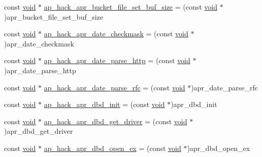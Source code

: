 \begin{DoxyCompactItemize}
\item 
const \hyperlink{group__MOD__ISAPI_gacd6cdbf73df3d9eed42fa493d9b621a6}{void} $\ast$ \hyperlink{srclib_2apr-util_2exports_8c_af76f18ce14697610cd245b2a5c2c5cd8}{ap\+\_\+hack\+\_\+apr\+\_\+bucket\+\_\+file\+\_\+set\+\_\+buf\+\_\+size} = (const \hyperlink{group__MOD__ISAPI_gacd6cdbf73df3d9eed42fa493d9b621a6}{void} $\ast$)apr\+\_\+bucket\+\_\+file\+\_\+set\+\_\+buf\+\_\+size
\item 
const \hyperlink{group__MOD__ISAPI_gacd6cdbf73df3d9eed42fa493d9b621a6}{void} $\ast$ \hyperlink{srclib_2apr-util_2exports_8c_a54a3736a0958f79fdb1567c67cb9e0e3}{ap\+\_\+hack\+\_\+apr\+\_\+date\+\_\+checkmask} = (const \hyperlink{group__MOD__ISAPI_gacd6cdbf73df3d9eed42fa493d9b621a6}{void} $\ast$)apr\+\_\+date\+\_\+checkmask
\item 
const \hyperlink{group__MOD__ISAPI_gacd6cdbf73df3d9eed42fa493d9b621a6}{void} $\ast$ \hyperlink{srclib_2apr-util_2exports_8c_a68bec97dff5362fa01a666ac7c37fba7}{ap\+\_\+hack\+\_\+apr\+\_\+date\+\_\+parse\+\_\+http} = (const \hyperlink{group__MOD__ISAPI_gacd6cdbf73df3d9eed42fa493d9b621a6}{void} $\ast$)apr\+\_\+date\+\_\+parse\+\_\+http
\item 
const \hyperlink{group__MOD__ISAPI_gacd6cdbf73df3d9eed42fa493d9b621a6}{void} $\ast$ \hyperlink{srclib_2apr-util_2exports_8c_a27c17a27f6d35668f0c3c662a731283b}{ap\+\_\+hack\+\_\+apr\+\_\+date\+\_\+parse\+\_\+rfc} = (const \hyperlink{group__MOD__ISAPI_gacd6cdbf73df3d9eed42fa493d9b621a6}{void} $\ast$)apr\+\_\+date\+\_\+parse\+\_\+rfc
\item 
const \hyperlink{group__MOD__ISAPI_gacd6cdbf73df3d9eed42fa493d9b621a6}{void} $\ast$ \hyperlink{srclib_2apr-util_2exports_8c_a8aa832533c504472e41dbddf95657829}{ap\+\_\+hack\+\_\+apr\+\_\+dbd\+\_\+init} = (const \hyperlink{group__MOD__ISAPI_gacd6cdbf73df3d9eed42fa493d9b621a6}{void} $\ast$)apr\+\_\+dbd\+\_\+init
\item 
const \hyperlink{group__MOD__ISAPI_gacd6cdbf73df3d9eed42fa493d9b621a6}{void} $\ast$ \hyperlink{srclib_2apr-util_2exports_8c_abee95a9b038f6b89db52203ff7c43be1}{ap\+\_\+hack\+\_\+apr\+\_\+dbd\+\_\+get\+\_\+driver} = (const \hyperlink{group__MOD__ISAPI_gacd6cdbf73df3d9eed42fa493d9b621a6}{void} $\ast$)apr\+\_\+dbd\+\_\+get\+\_\+driver
\item 
const \hyperlink{group__MOD__ISAPI_gacd6cdbf73df3d9eed42fa493d9b621a6}{void} $\ast$ \hyperlink{srclib_2apr-util_2exports_8c_a79827cc8edf096f1e0294e50833d7514}{ap\+\_\+hack\+\_\+apr\+\_\+dbd\+\_\+open\+\_\+ex} = (const \hyperlink{group__MOD__ISAPI_gacd6cdbf73df3d9eed42fa493d9b621a6}{void} $\ast$)apr\+\_\+dbd\+\_\+open\+\_\+ex

\end{DoxyCompactItemize}
